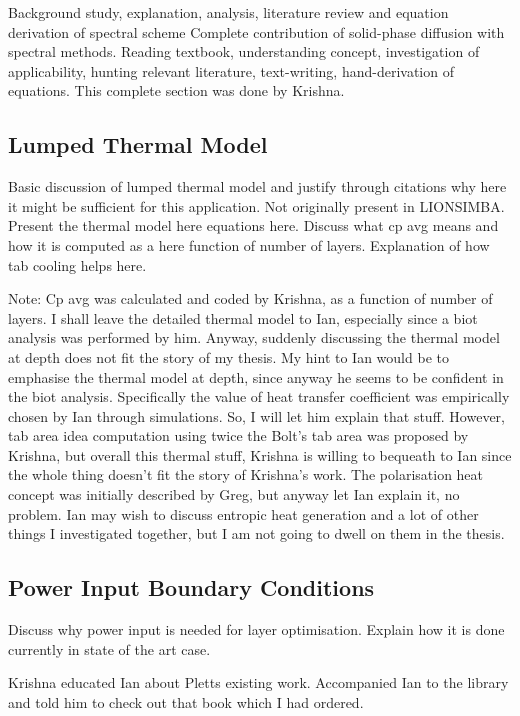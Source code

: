 Background study, explanation, analysis, literature review and equation
derivation of spectral scheme Complete contribution of solid-phase diffusion
with spectral methods. Reading textbook, understanding concept, investigation of
applicability, hunting relevant literature, text-writing, hand-derivation of
equations. This complete section was done by Krishna.

\subsection{Lumped Thermal Model}

Basic discussion of lumped thermal model and justify through citations why here
it might be sufficient for this application. Not originally present in
LIONSIMBA. Present the thermal model here equations here. Discuss what cp avg
means and how it is computed as a here function of number of layers. Explanation
of how tab cooling helps here.

Note: Cp avg was calculated and coded by Krishna, as a function of number of
layers. I shall leave the detailed thermal model to Ian, especially since a biot
analysis was performed by him. Anyway, suddenly discussing the thermal model at
depth does not fit the story of my thesis. My hint to Ian would be to emphasise
the thermal model at depth, since anyway he seems to be confident in the biot
analysis. Specifically the value of heat transfer coefficient was empirically
chosen by Ian through simulations. So, I will let him explain that stuff.
However, tab area idea computation using twice the Bolt's tab area was proposed
by Krishna, but overall this thermal stuff, Krishna is willing to bequeath to
Ian since the whole thing doesn't fit the story of Krishna's work. The
polarisation heat concept was initially described by Greg, but anyway let Ian
explain it, no problem. Ian may wish to discuss entropic heat generation and a
lot of other things I investigated together, but I am not going to dwell on
them in the thesis.


\subsection{Power Input Boundary Conditions}

Discuss why power input is needed for layer optimisation. Explain how it is done
currently in state of the art case.

Krishna educated Ian about Pletts existing work. Accompanied Ian to the library
and told him to check out that book which I had ordered.

